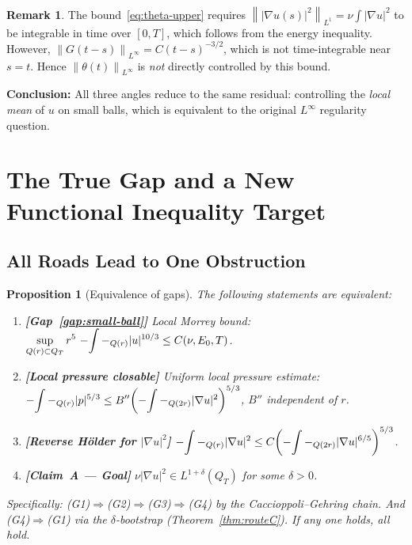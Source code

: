 \documentclass[11pt]{article}
\newtheorem{proposition}[theorem]{Proposition}
\theoremstyle{definition}
\newtheorem{remark}[theorem]{Remark}
\theoremstyle{remark}
\newcommand{\norm}[1]{\left\|#1\right\|}
\newcommand{\grad}{\nabla}
\newcommand{\Xint}{\mathop{\mathchoice{\vcenter{\hbox{$\displaystyle-$}}}%
  {\vcenter{\hbox{$\textstyle-$}}}%
  {\vcenter{\hbox{$\scriptstyle-$}}}%
  {\vcenter{\hbox{$\scriptscriptstyle-$}}}}\!\int}
\begin{document}
\begin{remark}
  The bound~\eqref{eq:theta-upper} requires $\norm{|\grad u(s)|^2}_{L^1}
  = \nu\int|\grad u|^2$ to be integrable in time over $[0,T]$, which
  follows from the energy inequality.  However, $\norm{G(t-s)}_{L^\infty}
  = C(t-s)^{-3/2}$, which is not time-integrable near $s=t$.
  Hence $\norm{\theta(t)}_{L^\infty}$ is \emph{not} directly controlled
  by this bound.

  \noindent\textbf{Conclusion:} All three angles reduce to the same residual:
  controlling the \emph{local mean} of $u$ on small balls, which is
  equivalent to the original $L^\infty$ regularity question.
\end{remark}

\section{The True Gap and a New Functional Inequality Target}
\label{sec:true-gap}

\subsection{All Roads Lead to One Obstruction}

\begin{proposition}[Equivalence of gaps]\label{prop:gap-equivalence}
  The following statements are equivalent:
  \begin{enumerate}[label=\textbf{(G\arabic*)}]
  \item \textbf{[Gap~\ref{gap:small-ball}]}
    Local Morrey bound: $\displaystyle
    \sup_{Q(r)\subset Q_T} r^5\,\Xint-_{Q(r)}|u|^{10/3}\leq C(\nu,E_0,T)$.

  \item \textbf{[Local pressure closable]}
    Uniform local pressure estimate:
    $\displaystyle\Xint-_{Q(r)}|p|^{5/3}
    \leq B''\!\left(\Xint-_{Q(2r)}|\grad u|^2\right)^{5/3}$,
    $B''$ independent of $r$.

  \item \textbf{[Reverse H\"older for $|\grad u|^2$]}
    $\displaystyle
    \Xint-_{Q(r)}|\grad u|^2
    \leq C\!\left(\Xint-_{Q(2r)}|\grad u|^{6/5}\right)^{5/3}$.

  \item \textbf{[Claim~A — Goal]}
    $\nu|\grad u|^2\in L^{1+\delta}(Q_T)$ for some $\delta>0$.
  \end{enumerate}
  Specifically: (G1)$\Rightarrow$(G2)$\Rightarrow$(G3)$\Rightarrow$(G4)
  by the Caccioppoli--Gehring chain.  And (G4)$\Rightarrow$(G1) via the
  $\delta$-bootstrap (Theorem~\ref{thm:routeC}).  If any one holds,
  all hold.
\end{proposition}
\end{document}
